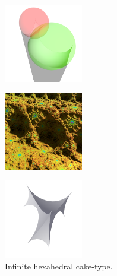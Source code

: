 \begin{figure}[htbp]
 \begin{minipage}[t]{0.5\textwidth}
  \begin{minipage}[t]{0.24\textwidth}
  \centering
  \includegraphics[width=1.35in, height=1.35in, keepaspectratio]{./img/application/sphairahedron/variations/hexahedralCake2/prism.png}
   \label{fig:cake-limit-inf-sphaira}
  \end{minipage}
  \hspace*{\fill}
  \begin{minipage}[t]{0.24\textwidth}
  \centering
  \includegraphics[width=1.35in, height=1.35in, keepaspectratio]{./img/application/sphairahedron/variations/hexahedralCake2/limit0644.png}
   \label{fig:cake-limit-inf-limit}
  \end{minipage}
  \hspace*{\fill}
  \caption{Infinite hexahedral cake-type.}
  \label{fig:cake-limit-inf}
 \end{minipage}
 \begin{minipage}[t]{0.5\textwidth}
  \begin{minipage}[t]{0.24\textwidth}
   \centering
   \includegraphics[width=1.35in, height=1.35in, keepaspectratio]{./img/application/sphairahedron/variations/hexahedralCake2/sphairahedron.png}
  \end{minipage}
  \hspace*{\fill}

\end{minipage}
\end{figure}
